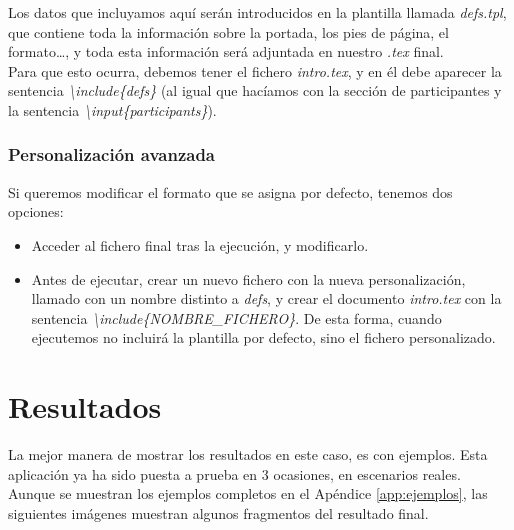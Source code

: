 \documentclass[a4paper, 12pt]{book}
\begin{document}
Los datos que incluyamos aquí serán introducidos en la plantilla llamada \textit{defs.tpl}, que contiene toda la información sobre la portada, los pies de página, el formato\ldots, y toda esta información será adjuntada en nuestro \textit{.tex} final.\\

Para que esto ocurra, debemos tener el fichero \textit{intro.tex}, y en él debe aparecer la sentencia \textit{\textbackslash include\{defs\}} (al igual que hacíamos con la sección de participantes y la sentencia \mbox{\textit{\textbackslash input\{participants\}}}).

\subsection{Personalización avanzada}
Si queremos modificar el formato que se asigna por defecto, tenemos dos opciones:
\begin{itemize}
	\item Acceder al fichero final tras la ejecución, y modificarlo.
	\item Antes de ejecutar, crear un nuevo fichero con la nueva personalización, llamado con un nombre distinto a \textit{defs}, y crear el documento \textit{intro.tex} con la sentencia \textit{\textbackslash include\{NOMBRE\_FICHERO\}}. De esta forma, cuando ejecutemos no incluirá la plantilla por defecto, sino el fichero personalizado.
\end{itemize}




\cleardoublepage
\chapter{Resultados}
\label{chap:resultados}
La mejor manera de mostrar los resultados en este caso, es con ejemplos. Esta aplicación ya ha sido puesta a prueba en 3 ocasiones, en escenarios reales.\\

Aunque se muestran los ejemplos completos en el Apéndice \ref{app:ejemplos}, las siguientes imágenes muestran algunos fragmentos del resultado final.\\
\end{document}
